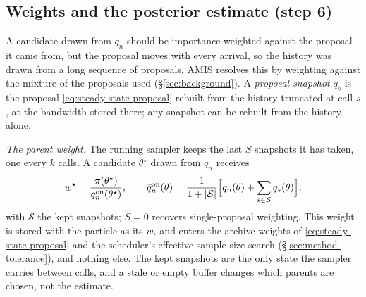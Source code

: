 \documentclass[10pt]{article}
\theoremstyle{plain}
\theoremstyle{definition}
\begin{document}
\subsection{Weights and the posterior estimate (step 6)}\label{sec:method-weights}\label{sec:method-amis}\label{sec:method-estimate}
A candidate drawn from $q_n$ should be importance-weighted against the proposal it came from, but the proposal moves with every arrival, so the history was drawn from a long sequence of proposals. AMIS resolves this by weighting against the mixture of the proposals used (\S\ref{sec:background}). A \emph{proposal snapshot} $q_s$ is the proposal \eqref{eq:steady-state-proposal} rebuilt from the history truncated at call $s$, at the bandwidth stored there; any snapshot can be rebuilt from the history alone.

\emph{The parent weight.} The running sampler keeps the last $S$ snapshots it has taken, one every $k$ calls. A candidate $\theta^\star$ drawn from $q_n$ receives
\begin{equation}
w^\star = \frac{\pi(\theta^\star)}{\bar q^{\mathrm{on}}_n(\theta^\star)},
\qquad
\bar q^{\mathrm{on}}_n(\theta) = \frac{1}{1+|\mathcal{S}|}\Bigl[q_n(\theta) + \sum_{s\in\mathcal{S}} q_s(\theta)\Bigr],
\label{eq:amis-weight}
\end{equation}
with $\mathcal{S}$ the kept snapshots; $S=0$ recovers single-proposal weighting. This weight is stored with the particle as its $w_i$ and enters the archive weights of \eqref{eq:steady-state-proposal} and the scheduler's effective-sample-size search (\S\ref{sec:method-tolerance}), and nothing else. The kept snapshots are the only state the sampler carries between calls, and a stale or empty buffer changes which parents are chosen, not the estimate.
\end{document}
